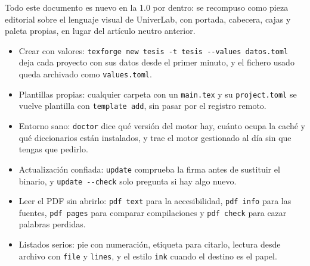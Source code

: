 \begin{novabox}
  Todo este documento es nuevo en la 1.0 por dentro: se recompuso como pieza
  editorial sobre el lenguaje visual de UniverLab, con portada, cabecera,
  cajas y paleta propias, en lugar del artículo neutro anterior.
\end{novabox}

\begin{itemize}
  \item Crear con valores: \texttt{texforge new tesis -t tesis -{}-values
    datos.toml} deja cada proyecto con sus datos desde el primer minuto, y
  el fichero usado queda archivado como \texttt{values.toml}.
  \item Plantillas propias: cualquier carpeta con un \texttt{main.tex} y su
  \texttt{project.toml} se vuelve plantilla con \texttt{template add}, sin
  pasar por el registro remoto.
  \item Entorno sano: \texttt{doctor} dice qué versión del motor hay,
  cuánto ocupa la caché y qué diccionarios están instalados, y trae
  el motor gestionado al día sin que tengas que pedirlo.
  \item Actualización confiada: \texttt{update} comprueba la firma antes
  de sustituir el binario, y \texttt{update -{}-check} solo pregunta si hay
  algo nuevo.
  \item Leer el PDF sin abrirlo: \texttt{pdf text} para la accesibilidad,
  \texttt{pdf info} para las fuentes, \texttt{pdf pages} para comparar
  compilaciones y \texttt{pdf check} para cazar palabras perdidas.
  \item Listados serios: pie con numeración, etiqueta para citarlo,
  lectura desde archivo con \texttt{file} y \texttt{lines}, y el estilo
  \texttt{ink} cuando el destino es el papel.
\end{itemize}
